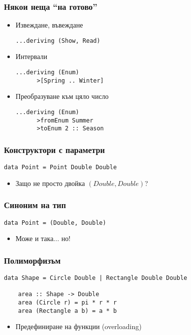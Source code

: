 \documentclass{beamer}
\begin{document}
\begin{frame}[fragile]
  \frametitle{Някои неща ``на готово''}

\begin{itemize}
  \item Извеждане, въвеждане
  \begin{lstlisting}[basicstyle=\small]
      ...deriving (Show, Read)
  \end{lstlisting}
  \item Интервали
  \begin{lstlisting}[basicstyle=\small]
      ...deriving (Enum)
      >[Spring .. Winter]
  \end{lstlisting}
  \item Преобразуване към цяло число
  \begin{lstlisting}[basicstyle=\small]
      ...deriving (Enum)
      >fromEnum Summer
      >toEnum 2 :: Season
  \end{lstlisting}
\end{itemize}

\end{frame}

\begin{frame}[fragile]
  \frametitle{Конструктори с параметри}

  \begin{lstlisting}[basicstyle=\small]
    data Point = Point Double Double
  \end{lstlisting}

\begin{itemize}
  \item Защо не просто двойка $(Double, Double)$?
\end{itemize}

\end{frame}


\begin{frame}[fragile]
  \frametitle{Синоним на тип}

  \begin{lstlisting}[basicstyle=\small]
    data Point = (Double, Double)
  \end{lstlisting}

\begin{itemize}
  \item Може и така... но!
\end{itemize}

\end{frame}


\begin{frame}[fragile]
  \frametitle{Полиморфизъм}

  \begin{lstlisting}[basicstyle=\small]
    data Shape = Circle Double | Rectangle Double Double

    area :: Shape -> Double
    area (Circle r) = pi * r * r
    area (Rectangle a b) = a * b
  \end{lstlisting}

\begin{itemize}
  \item Предефиниране на функции (overloading)
\end{itemize}

\end{frame}
\end{document}
